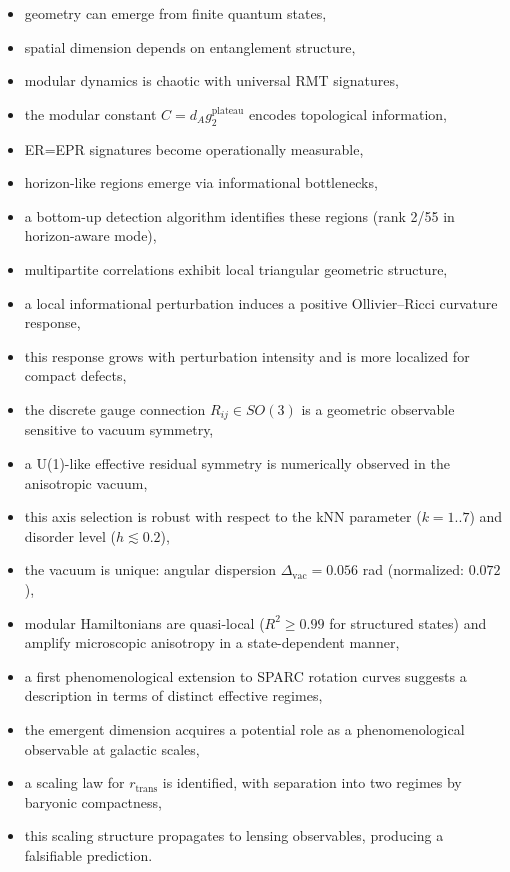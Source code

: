 \documentclass[11pt]{article}
\begin{document}
\begin{itemize}
\item geometry can emerge from finite quantum states,
\item spatial dimension depends on entanglement structure,
\item modular dynamics is chaotic with universal RMT signatures,
\item the modular constant $C=d_A g_2^{\mathrm{plateau}}$ encodes topological information,
\item ER=EPR signatures become operationally measurable,
\item horizon-like regions emerge via informational bottlenecks,
\item a bottom-up detection algorithm identifies these regions (rank 2/55 in horizon-aware mode),
\item multipartite correlations exhibit local triangular geometric structure,
\item a local informational perturbation induces a positive Ollivier--Ricci curvature response,
\item this response grows with perturbation intensity and is more localized for compact defects,
\item the discrete gauge connection $R_{ij} \in SO(3)$ is a geometric observable sensitive to vacuum symmetry,
\item a U(1)-like effective residual symmetry is numerically observed in the anisotropic vacuum,
\item this axis selection is robust with respect to the kNN parameter ($k=1..7$) and disorder level ($h \lesssim 0.2$),
\item the vacuum is unique: angular dispersion $\Delta_{\mathrm{vac}} = 0.056$ rad (normalized: $0.072$),
\item modular Hamiltonians are quasi-local ($R^2 \geq 0.99$ for structured states) and amplify microscopic anisotropy in a state-dependent manner,
\item a first phenomenological extension to SPARC rotation curves suggests a description in terms of distinct effective regimes,
\item the emergent dimension acquires a potential role as a phenomenological observable at galactic scales,
\item a scaling law for $r_{\mathrm{trans}}$ is identified, with separation into two regimes by baryonic compactness,
\item this scaling structure propagates to lensing observables, producing a falsifiable prediction.
\end{itemize}
\end{document}
